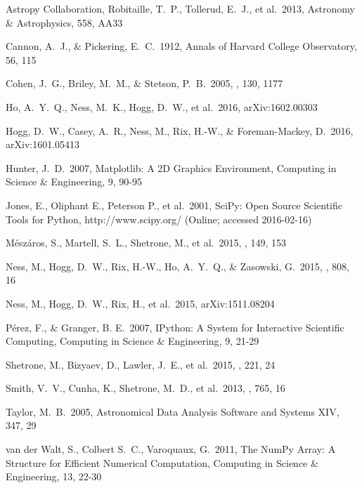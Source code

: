 \documentclass[12pt,preprint]{aastex}
\begin{document}
\begin{thebibliography}{dummy}\raggedright
{} Astropy Collaboration, Robitaille, T.~P., Tollerud, E.~J., et al.\ 2013, Astronomy \& Astrophysics, 558, AA33 

 Cannon, A.~J., \& Pickering, E.~C.\ 1912, Annals of Harvard College Observatory, 56, 115 

 Cohen, J.~G., Briley, 
M.~M., \& Stetson, P.~B.\ 2005, \aj, 130, 1177 

 Ho, A.~Y.~Q., Ness, M.~K., 
Hogg, D.~W., et al.\ 2016, arXiv:1602.00303 

 Hogg, D.~W., Casey, A.~R., 
Ness, M., Rix, H.-W., \& Foreman-Mackey, D.\ 2016, arXiv:1601.05413 

 Hunter, J.~D.\ 2007, Matplotlib: A 2D Graphics Environment, Computing in Science \& Engineering, 9, 90-95

 Jones, E., Oliphant E., Peterson P., et al.\ 2001, SciPy: Open Source Scientific Tools for Python, http://www.scipy.org/ (Online; accessed 2016-02-16)

M{\'e}sz{\'a}ros, S., Martell, S.~L., Shetrone, M., et al.\ 2015, \aj, 149, 
153 

 Ness, M., Hogg, D.~W., 
Rix, H.-W., Ho, A.~Y.~Q., \& Zasowski, G.\ 2015, \apj, 808, 16

 Ness, M., Hogg, D.~W., 
Rix, H., et al.\ 2015, arXiv:1511.08204 

 P\'erez, F., \& Granger, B. E.\ 2007, IPython: A System for Interactive Scientific Computing, Computing in Science \& Engineering, 9, 21-29

 Shetrone, M., Bizyaev, 
D., Lawler, J.~E., et al.\ 2015, \apjs, 221, 24 

 Smith, V.~V., Cunha, K., 
Shetrone, M.~D., et al.\ 2013, \apj, 765, 16 

 Taylor, M.~B.\ 2005, Astronomical Data Analysis Software and Systems XIV, 347, 29 

 van der Walt, S., Colbert S.~C., Varoquaux, G.\ 2011, The NumPy Array: A Structure for Efficient Numerical Computation, Computing in Science \& Engineering, 13, 22-30


\end{thebibliography}
\end{document}
